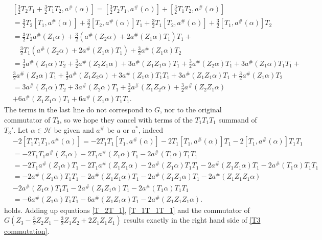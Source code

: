 \documentclass[oneside,reqno,12pt]{amsart}
\begin{document}
\begin{align*}
&\left[\frac{3}{2} T_2 T_1 +\frac{3}{2} T_1 T_2, a^{\#}(\alpha)\right]
=\left[\frac{3}{2} T_2 T_1, a^{\#}(\alpha)\right]+\left[\frac{3}{2} T_1 T_2, a^{\#}(\alpha)\right]\\
&=\frac{3}{2} T_2 \left[ T_1, a^{\#}(\alpha)\right]+\frac{3}{2}  \left[ T_2, a^{\#}(\alpha)\right]T_1+\frac{3}{2} T_1\left[ T_2, a^{\#}(\alpha)\right]+\frac{3}{2} \left[ T_1, a^{\#}(\alpha)\right]T_2\\
&=\frac{3}{2} T_2 a^{\#}\left(Z_1\alpha\right)+\frac{3}{2}  \left(a^{\#}\left(Z_2\alpha\right)+2a^{\#}\left(Z_1\alpha\right)T_1\right)T_1+\\ 
&\quad \frac{3}{2} T_1\left( a^{\#}\left(Z_2 \alpha\right)+2a^{\#}\left(Z_1 \alpha\right)T_1\right)+\frac{3}{2}  a^{\#}\left(Z_1 \alpha\right)T_2\\
&=\frac{3}{2}  a^{\#}\left(Z_1\alpha\right)T_2 
+ \frac{3}{2} a^{\#}\left(Z_2 Z_1 \alpha \right) 
+3 a^{\#}\left(Z_1Z_1 \alpha \right) T_1
+\frac{3}{2}a^{\#}\left(Z_2\alpha\right)T_1
+3a^{\#}\left(Z_1\alpha\right)T_1T_1+\\ 
& \frac{3}{2}  a^{\#}\left(Z_2 \alpha\right)T_1
+\frac{3}{2}  a^{\#}\left(Z_1 Z_2 \alpha\right)
+3a^{\#}\left(Z_1 \alpha\right)T_1 T_1
+3a^{\#}\left(Z_1 Z_1 \alpha\right) T_1
+\frac{3}{2}  a^{\#}\left(Z_1 \alpha\right)T_2\\
&=3  a^{\#}\left(Z_1\alpha\right)T_2 \tag{\(T_2T_1\)}\label{T_2T_1}
+3a^{\#}\left(Z_2\alpha\right)T_1
+\frac{3}{2}  a^{\#}\left(Z_1 Z_2 \alpha\right)
+ \frac{3}{2} a^{\#}\left(Z_2 Z_1 \alpha \right) \\
&+6 a^{\#}\left(Z_1Z_1 \alpha \right) T_1
+6a^{\#}\left(Z_1\alpha\right)T_1T_1
.\end{align*}
The terms in the last line do not correspond to \(G\), nor to the original commutator of \(T_3\), so we hope they cancel with terms of the \(T_1T_1T_1\) summand of \(T_3'\). Let \(\alpha\in\mathcal{H}\) be given and \(a^{\#}\) be \(a\) or \(a^*\), indeed
\begin{align*}
&-2\left[ T_1T_1T_1,a^{\#}(\alpha)\right]
=-2T_1T_1\left[ T_1,a^{\#}(\alpha)\right]
-2T_1\left[ T_1,a^{\#}(\alpha)\right]T_1
-2\left[ T_1,a^{\#}(\alpha)\right]T_1T_1\\
&=-2T_1T_1a^{\#}(Z_1\alpha)
-2T_1a^{\#}(Z_1\alpha)T_1
-2a^{\#}(T_1\alpha)T_1T_1\\
&=-2T_1a^{\#}(Z_1\alpha)T_1
-2T_1a^{\#}(Z_1 Z_1\alpha)
-2a^{\#}(Z_1\alpha)T_1T_1
-2a^{\#}(Z_1Z_1\alpha)T_1
-2a^{\#}(T_1\alpha)T_1T_1\\
&=-2a^{\#}(Z_1\alpha)T_1T_1
-2a^{\#}(Z_1Z_1\alpha)T_1
-2a^{\#}(Z_1 Z_1\alpha)T_1
-2a^{\#}(Z_1Z_1 Z_1\alpha)\\
&-2a^{\#}(Z_1\alpha)T_1T_1
-2a^{\#}(Z_1Z_1\alpha)T_1
-2a^{\#}(T_1\alpha)T_1T_1\\
&=-6a^{\#}(Z_1\alpha)T_1T_1\label{T_1T_1T_1}\tag{\(T_1T_1T_1\)}
-6a^{\#}(Z_1Z_1\alpha)T_1
-2a^{\#}(Z_1Z_1 Z_1\alpha)
.\end{align*}
holds. Adding up equations \eqref{T_2T_1}, \eqref{T_1T_1T_1} and the commutator of \\
 \(G\left( Z_3 - \frac{3}{2}Z_2Z_1 - \frac{3}{2}Z_1Z_2 + 2 Z_1Z_1Z_1\right)\) results exactly in the right hand side of \eqref{T3 commutation}. 
 
\end{document}
